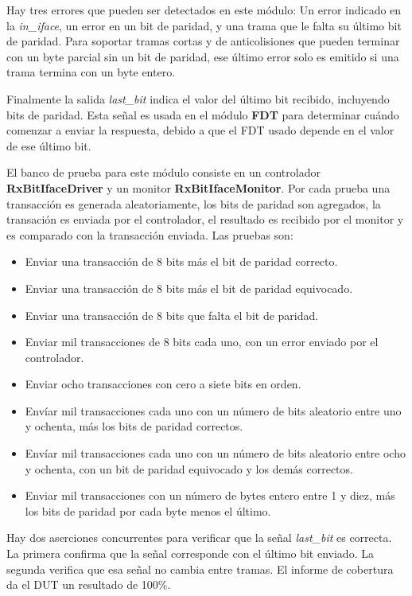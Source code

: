 \documentclass[a4paper, twoside, 11pt]{report}
\begin{document}
Hay tres errores que pueden ser detectados en este módulo: Un error indicado en la \textit{in\_iface}, un error en un bit de paridad, y una trama que le falta su último bit de paridad. Para soportar tramas cortas y de anticolisiones que pueden terminar con un byte parcial sin un bit de paridad, ese último error solo es emitido si una trama termina con un byte entero.

Finalmente la salida \textit{last\_bit} indica el valor del último bit recibido, incluyendo bits de paridad. Esta señal es usada en el módulo \textbf{FDT} para determinar cuándo comenzar a enviar la respuesta, debido a que el FDT usado depende en el valor de ese último bit.

El banco de prueba para este módulo consiste en un controlador \textbf{RxBitIfaceDriver} y un monitor \textbf{RxBitIfaceMonitor}. Por cada prueba una transacción es generada aleatoriamente, los bits de paridad son agregados, la transación es enviada por el controlador, el resultado es recibido por el monitor y es comparado con la transacción enviada. Las pruebas son:

\begin{itemize}
  \item Enviar una transacción de 8 bits más el bit de paridad correcto.
  \item Enviar una transacción de 8 bits más el bit de paridad equivocado.
  \item Enviar una transacción de 8 bits que falta el bit de paridad.
  \item Enviar mil transacciones de 8 bits cada uno, con un error enviado por el controlador.
  \item Enviar ocho transacciones con cero a siete bits en orden.
  \item Envíar mil transacciones cada uno con un número de bits aleatorio entre uno y ochenta, más los bits de paridad correctos.
  \item Envíar mil transacciones cada uno con un número de bits aleatorio entre ocho y ochenta, con un bit de paridad equivocado y los demás correctos.
  \item Enviar mil transacciones con un número de bytes entero entre 1 y diez, más los bits de paridad por cada byte menos el último.
\end{itemize}

Hay dos aserciones concurrentes para verificar que la señal \textit{last\_bit} es correcta. La primera confirma que la señal corresponde con el último bit enviado. La segunda verifica que esa señal no cambia entre tramas. El informe de cobertura da el DUT un resultado de 100\%.
\end{document}
